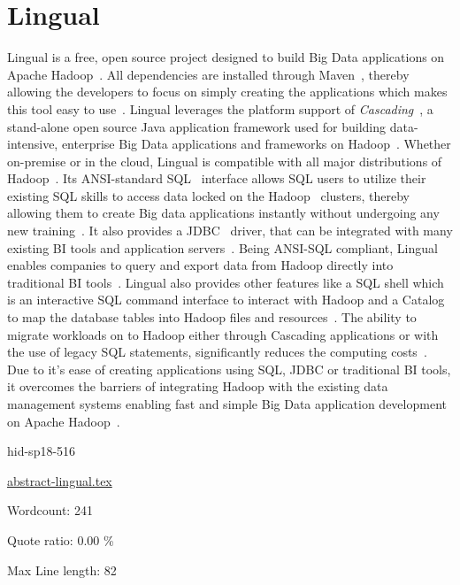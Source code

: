 \section{Lingual}

Lingual is a free, open source project designed to build Big Data applications
on Apache Hadoop~\cite{hid-sp18-516-www-drivenio-lingual}. All dependencies are
installed through Maven~\cite{hid-sp18-516-www-wiki-maven}, thereby allowing the 
developers to focus on simply creating the applications which makes this tool 
easy to use~\cite{hid-sp18-516-www-cascading}. Lingual leverages the platform 
support of \textit{Cascading}~\cite{hid-sp18-516-www-wiki-cascading}, a 
stand-alone open source Java application framework used for building 
data-intensive, enterprise Big Data applications and frameworks on 
Hadoop~\cite{hid-sp18-516-www-drivenio-lingual}. Whether on-premise or in the 
cloud, Lingual is compatible with all major distributions of 
Hadoop~\cite{hid-sp18-516-www-drivenio-lingual}. Its ANSI-standard 
SQL~\cite{hid-sp18-516-www-wiki-sql} interface allows SQL users to utilize 
their existing SQL skills to access data locked on the 
Hadoop~\cite{hid-sp18-516-www-wiki-hadoop} clusters, thereby allowing them 
to create Big data applications instantly without undergoing any new 
training~\cite{hid-sp18-516-www-drivenio-lingual}. It also provides a 
JDBC~\cite{hid-sp18-516-www-wiki-jdbc} driver, that can be integrated with many 
existing BI tools and application servers~\cite{hid-sp18-516-www-cascading}. 
Being ANSI-SQL compliant, Lingual enables companies to query and export data 
from Hadoop directly into traditional BI tools~\cite{hid-sp18-516-www-cascading}. 
Lingual also provides other features like a SQL shell which is an interactive 
SQL command interface to interact with Hadoop and a Catalog to map the database 
tables into Hadoop files and resources~\cite{hid-sp18-516-www-cascading}. The 
ability to migrate workloads on to Hadoop either through Cascading applications 
or with the use of legacy SQL statements, significantly reduces the computing
costs~\cite{hid-sp18-516-www-cascading}. Due to it's ease of creating
applications using SQL, JDBC or traditional BI tools, it overcomes the barriers
of integrating Hadoop with the existing data management systems enabling fast
and simple Big Data application development on Apache
Hadoop~\cite{hid-sp18-516-www-drivenio-lingual}.


\begin{IU}

hid-sp18-516

\href{https://github.com/cloudmesh-community/hid-sp18-516/blob/master//technology/abstract-lingual.tex}{abstract-lingual.tex}

 

Wordcount: 241


Quote ratio: 0.00 \%
 
Max Line length: 82
\end{IU}

